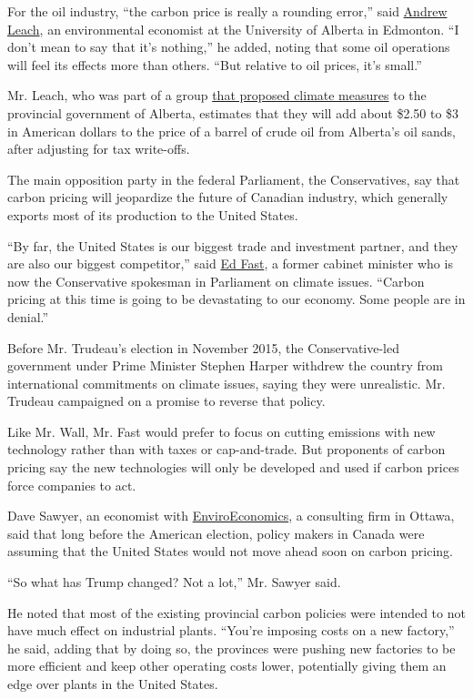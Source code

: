 For the oil industry, ``the carbon price is really a rounding error,''
said
\href{https://www.ualberta.ca/business/about/contact-us/school-directory/andrew-leach}{Andrew
Leach}, an environmental economist at the University of Alberta in
Edmonton. ``I don't mean to say that it's nothing,'' he added, noting
that some oil operations will feel its effects more than others. ``But
relative to oil prices, it's small.''

Mr. Leach, who was part of a group
\href{http://www.alberta.ca/documents/climate/climate-leadership-report-to-minister.pdf}{that
proposed climate measures} to the provincial government of Alberta,
estimates that they will add about \$2.50 to \$3 in American dollars to
the price of a barrel of crude oil from Alberta's oil sands, after
adjusting for tax write-offs.

The main opposition party in the federal Parliament, the Conservatives,
say that carbon pricing will jeopardize the future of Canadian industry,
which generally exports most of its production to the United States.

``By far, the United States is our biggest trade and investment partner,
and they are also our biggest competitor,'' said
\href{http://edfast.ca/}{Ed Fast}, a former cabinet minister who is now
the Conservative spokesman in Parliament on climate issues. ``Carbon
pricing at this time is going to be devastating to our economy. Some
people are in denial.''

Before Mr. Trudeau's election in November 2015, the Conservative-led
government under Prime Minister Stephen Harper withdrew the country from
international commitments on climate issues, saying they were
unrealistic. Mr. Trudeau campaigned on a promise to reverse that policy.

Like Mr. Wall, Mr. Fast would prefer to focus on cutting emissions with
new technology rather than with taxes or cap-and-trade. But proponents
of carbon pricing say the new technologies will only be developed and
used if carbon prices force companies to act.

Dave Sawyer, an economist with
\href{http://www.enviroeconomics.org/team}{EnviroEconomics}, a
consulting firm in Ottawa, said that long before the American election,
policy makers in Canada were assuming that the United States would not
move ahead soon on carbon pricing.

``So what has Trump changed? Not a lot,'' Mr. Sawyer said.

He noted that most of the existing provincial carbon policies were
intended to not have much effect on industrial plants. ``You're imposing
costs on a new factory,'' he said, adding that by doing so, the
provinces were pushing new factories to be more efficient and keep other
operating costs lower, potentially giving them an edge over plants in
the United States.

